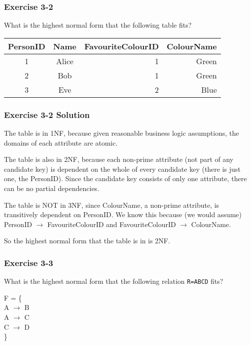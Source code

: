 \begin{frame}
\frametitle{Exercise 3-2}

What is the highest normal form that the following table fits?

\begin{center}
  \begin{tabular}{||c c r r||}
    \hline
    PersonID & Name & FavouriteColourID & ColourName \\ [0.5ex]
    \hline\hline
    1 & Alice & 1 & Green \\
    \hline
    2 & Bob & 1 & Green \\
    \hline
    3 & Eve & 2 & Blue \\
    \hline
  \end{tabular}
\end{center}

\end{frame}


\begin{frame}
\frametitle{Exercise 3-2 Solution}

The table is in 1NF, because given reasonable business logic assumptions, the domains of each attribute are atomic.

The table is also in 2NF, because each non-prime attribute (not part of any candidate key) is dependent on the whole of every candidate key (there is just one, the PersonID). Since the candidate key consists of only one attribute, there can be no partial dependencies.

The table is NOT in 3NF, since ColourName, a non-prime attribute, is transitively dependent on PersonID. We know this because (we would assume) PersonID $\rightarrow$ FavouriteColourID and FavouriteColourID $\rightarrow$ ColourName.

So the highest normal form that the table is in is 2NF.

\end{frame}


\begin{frame}
\frametitle{Exercise 3-3}

What is the highest normal form that the following relation \texttt{R=ABCD} fits?

F = \{ \\
A $\rightarrow$ B \\
A $\rightarrow$ C \\
C $\rightarrow$ D \\
\} \\

\end{frame}


